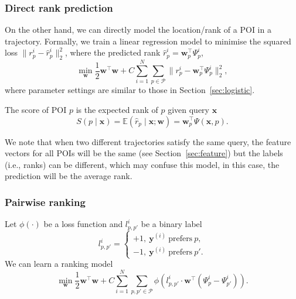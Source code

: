 \documentclass[9pt]{extarticle}
\begin{document}
\subsubsection{Direct rank prediction}
\label{sec:linear}

On the other hand, we can directly model the location/rank of a POI in a trajectory.
Formally, we train a linear regression model to minimise the squared loss $\|r_p^i - \hat{r}_p^i \|_2^2$, 
where the predicted rank $\hat{r}_p^i = \mathbf{w}_p^\top \Psi_p^i$,
\begin{equation*}
\min_{\mathbf{w}} \frac{1}{2} \mathbf{w}^\top \mathbf{w} + C \sum_{i=1}^N \sum_{p \in \mathcal{P}} \|r_p^i - \mathbf{w}_p^\top \Psi_p^i \|_2^2,
\end{equation*}
where parameter settings are similar to those in Section~\ref{sec:logistic}.

The score of POI $p$ is the expected rank of $p$ given query $\mathbf{x}$ 
\begin{equation*}
S(p \mid \mathbf{x})
= \mathbb{E}(\hat{r}_p \mid \mathbf{x}; \mathbf{w}) 
= \mathbf{w}_p^\top \Psi(\mathbf{x}, p).
\end{equation*}


We note that when two different trajectories satisfy the same query, the feature vectors for all POIs will be the same (see Section~\ref{sec:feature})
but the labels (i.e., ranks) can be different, which may confuse this model, in this case, the prediction will be the average rank.




\subsubsection{Pairwise ranking}
\label{sec:rank}

Let $\phi(\cdot)$ be a loss function and $l_{p,p'}^i$ be a binary label
\begin{equation*}
l_{p,p'}^i = \begin{cases}
+1,~ \mathbf{y}^{(i)} ~\text{prefers}~ p, \\
-1,~ \mathbf{y}^{(i)} ~\text{prefers}~ p'.
\end{cases}
\end{equation*}
We can learn a ranking model
\begin{equation*}
\min_{\mathbf{w}} \frac{1}{2} \mathbf{w}^\top \mathbf{w} +  
C \sum_{i=1}^N \sum_{p, p' \in \mathcal{P}} \phi \left( l_{p,p'}^i \cdot \mathbf{w}^\top \left( \Psi_p^i - \Psi_{p'}^i \right) \right).
\end{equation*}
\end{document}
